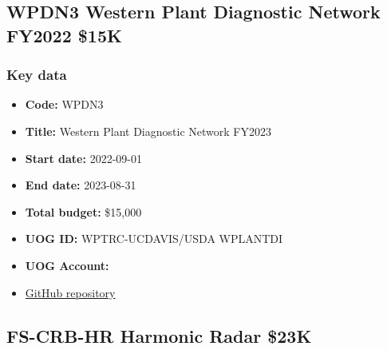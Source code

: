 \newpage
\subsection{WPDN3 Western Plant Diagnostic Network FY2022 \$15K}
\label{WPDN3}

\subsubsection{Key data}
\begin{itemize}
	\setlength\itemsep{0em}	
	\item \textbf{Code:} WPDN3
	\item \textbf{Title:} Western Plant Diagnostic Network FY2023
	\item \textbf{Start date:} 2022-09-01
	\item \textbf{End date:} 2023-08-31
	\item \textbf{Total budget:} \$15,000
	\item \textbf{UOG ID:} WPTRC-UCDAVIS/USDA WPLANTDI
	\item \textbf{UOG Account:} 
	\item \href{https://github.com/aubreymoore/WPDN}{GitHub repository}
\end{itemize}

%


\newpage
\subsection{FS-CRB-HR Harmonic Radar \$23K}
\label{FS-CRB-HR}

